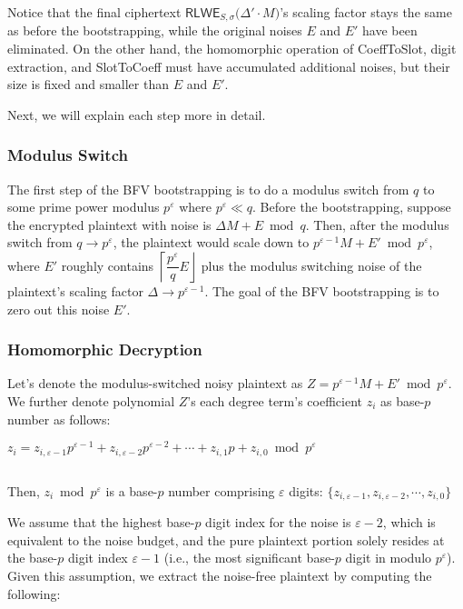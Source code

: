 $ $

Notice that the final ciphertext $ \textsf{RLWE}_{S, \sigma}\bm(\Delta' \cdot M \bm)$'s scaling factor stays the same as before the bootstrapping, while the original noises $E$ and $E'$ have been eliminated. On the other hand, the homomorphic operation of \textsf{CoeffToSlot}, digit extraction, and \textsf{SlotToCoeff} must have accumulated additional noises, but their size is fixed and smaller than $E$ and $E'$. 

Next, we will explain each step more in detail. 

\subsubsection{Modulus Switch}
\label{subsubsec:bfv-bootstrapping-modulus-switch}

The first step of the BFV bootstrapping is to do a modulus switch from $q$ to some prime power modulus $p^\varepsilon$ where $p^\varepsilon \ll q$. Before the bootstrapping, suppose the encrypted plaintext with noise is $\Delta M + E \bmod q$. Then, after the modulus switch from $q \rightarrow p^\varepsilon$, the plaintext would scale down to $p^{\varepsilon-1}M + E' \bmod p^\varepsilon$, where $E'$ roughly contains $\left\lceil\dfrac{p^\varepsilon}{q} E\right\rfloor$ plus the modulus switching noise of the plaintext's scaling factor $\Delta \rightarrow p^{\varepsilon-1}$. The goal of the BFV bootstrapping is to zero out this noise $E'$.  

\subsubsection{Homomorphic Decryption}
\label{subsubsec:bfv-bootstrapping-homomorphic-decryption}

Let's denote the modulus-switched noisy plaintext as $Z = p^{\varepsilon-1}M + E' \bmod p^\varepsilon$. We further denote polynomial $Z$'s each degree term's coefficient $z_i$ as base-$p$ number as follows: 

$z_i = z_{i, \varepsilon-1}p^{\varepsilon-1} + z_{i, \varepsilon-2}p^{\varepsilon-2} + \cdots + z_{i,1}p + z_{i,0} \bmod p^\varepsilon$

$ $

Then, $z_i \bmod p^\varepsilon$ is a base-$p$ number comprising $\varepsilon$ digits: $\{z_{i,\varepsilon-1}, z_{i,\varepsilon-2}, \cdots, z_{i,0}\}$


We assume that the highest base-$p$ digit index for the noise is $\varepsilon-2$, which is equivalent to the noise budget, and the pure plaintext portion solely resides at the base-$p$ digit index $\varepsilon-1$ (i.e., the most significant base-$p$ digit in modulo $p^\varepsilon$). Given this assumption, we extract the noise-free plaintext by computing the following:

